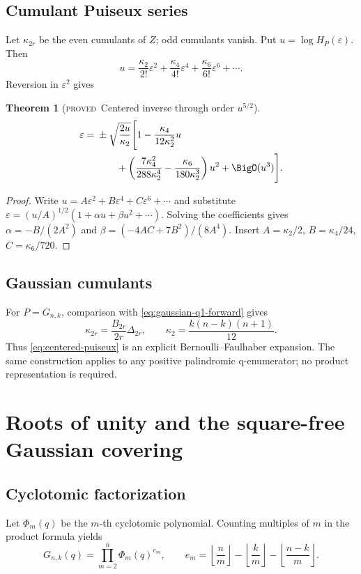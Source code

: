 \documentclass[11pt,letterpaper,oneside,openany]{book}
\newtheorem{theorem}{Theorem}[chapter]
\theoremstyle{definition}
\theoremstyle{remark}
\newcommand{\statusproved}{\textcolor{provedgreen}{\textsc{proved}}}
\begin{document}
\section{Cumulant Puiseux series}
Let \(\kappa_{2r}\) be the even cumulants of \(Z\); odd cumulants vanish.  Put
\(u=\log H_P(\varepsilon)\).  Then
\[
 u=\frac{\kappa_2}{2!}\varepsilon^2+
 \frac{\kappa_4}{4!}\varepsilon^4+
 \frac{\kappa_6}{6!}\varepsilon^6+\cdots.
\]
Reversion in \(\varepsilon^2\) gives
\begin{theorem}[\statusproved\ Centered inverse through order \(u^{5/2}\)]
\begin{align}
 \varepsilon={}&\pm\sqrt{\frac{2u}{\kappa_2}}
 \Biggl[
 1-\frac{\kappa_4}{12\kappa_2^2}u \notag \\
 &\qquad+
 \left(\frac{7\kappa_4^2}{288\kappa_2^4}
       -\frac{\kappa_6}{180\kappa_2^3}\right)u^2
 +\BigO(u^3)
 \Biggr].
 \label{eq:centered-puiseux}
\end{align}
\end{theorem}
\begin{proof}
Write \(u=A\varepsilon^2+B\varepsilon^4+C\varepsilon^6+\cdots\) and substitute
\(\varepsilon=(u/A)^{1/2}(1+\alpha u+\beta u^2+\cdots)\).  Solving the
coefficients gives
\(\alpha=-B/(2A^2)\) and
\(\beta=(-4AC+7B^2)/(8A^4)\).  Insert
\(A=\kappa_2/2\), \(B=\kappa_4/24\), \(C=\kappa_6/720\).
\end{proof}

\section{Gaussian cumulants}
For \(P=G_{n,k}\), comparison with \cref{eq:gaussian-q1-forward} gives
\begin{equation}
 \kappa_{2r}=\frac{B_{2r}}{2r}\Delta_{2r},
 \qquad
 \kappa_2=\frac{k(n-k)(n+1)}{12}.
 \label{eq:gaussian-cumulants}
\end{equation}
Thus \cref{eq:centered-puiseux} is an explicit Bernoulli--Faulhaber expansion.
The same construction applies to any positive palindromic q-enumerator; no
product representation is required.

\chapter{Roots of unity and the square-free Gaussian covering}

\section{Cyclotomic factorization}
Let \(\Phi_m(q)\) be the \(m\)-th cyclotomic polynomial.  Counting multiples of
\(m\) in the product formula yields
\begin{equation}
 G_{n,k}(q)=\prod_{m=2}^{n}\Phi_m(q)^{e_m},
 \qquad
 e_m=\left\lfloor\frac nm\right\rfloor
 -\left\lfloor\frac km\right\rfloor
 -\left\lfloor\frac{n-k}m\right\rfloor.
 \label{eq:gaussian-cyclotomic}
\end{equation}
\end{document}
